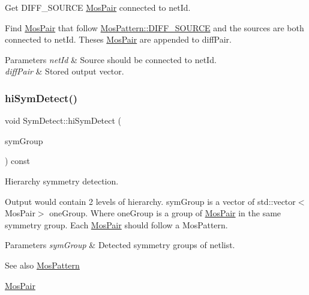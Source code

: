 Get D\+I\+F\+F\+\_\+\+S\+O\+U\+R\+CE \hyperlink{structMosPair}{Mos\+Pair} connected to net\+Id. 

Find \hyperlink{structMosPair}{Mos\+Pair} that follow \hyperlink{type_8h_af19eddb079bfea723256710b029c38e8ad45b64a7d6b85dde1b52dd5a18863933}{Mos\+Pattern\+::\+D\+I\+F\+F\+\_\+\+S\+O\+U\+R\+CE} and the sources are both connected to net\+Id. Theses \hyperlink{structMosPair}{Mos\+Pair} are appended to diff\+Pair.


\begin{DoxyParams}{Parameters}
{\em net\+Id} & Source should be connected to net\+Id. \\
\hline
{\em diff\+Pair} & Stored output vector. \\
\hline
\end{DoxyParams}
\mbox{\label{classSymDetect_a81ec317ab0f508b3e0af483ef8a2c1ac}} 
\subsubsection{\texorpdfstring{hi\+Sym\+Detect()}{hiSymDetect()}}
{\footnotesize\ttfamily void Sym\+Detect\+::hi\+Sym\+Detect (\begin{DoxyParamCaption}\item[{std\+::vector$<$ std\+::vector$<$ \hyperlink{structMosPair}{Mos\+Pair} $>$$>$ \&}]{sym\+Group }\end{DoxyParamCaption}) const}



Hierarchy symmetry detection. 

Output would contain 2 levels of hierarchy. sym\+Group is a vector of std\+::vector$<$\+Mos\+Pair$>$ one\+Group. Where one\+Group is a group of \hyperlink{structMosPair}{Mos\+Pair} in the same symmetry group. Each \hyperlink{structMosPair}{Mos\+Pair} should follow a Mos\+Pattern.


\begin{DoxyParams}{Parameters}
{\em sym\+Group} & Detected symmetry groups of netlist. \\
\hline
\end{DoxyParams}
\begin{DoxySeeAlso}{See also}
\hyperlink{type_8h_af19eddb079bfea723256710b029c38e8}{Mos\+Pattern} 

\hyperlink{structMosPair}{Mos\+Pair} 
\end{DoxySeeAlso}
\mbox{\label{classSymDetect_ae6a1ba27f6768f215cba0623b6e2ce08}} 
